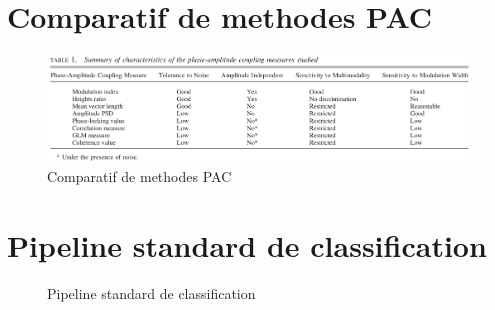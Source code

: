 
\section{Comparatif de methodes PAC \citep{tort_measuring_2010}}
\begin{figure}[H]
	\centering
	\includegraphics[scale=0.4,angle=-90]{./figures/PAC_methods_comparison}
	\caption{Comparatif de methodes PAC \citep{tort_measuring_2010}}
	\label{comp_pac}
\end{figure}

\section{Pipeline standard de classification}
\begin{figure}[H]
	\centering
	\caption{Pipeline standard de classification}
	\label{clf_pip}
\end{figure}

